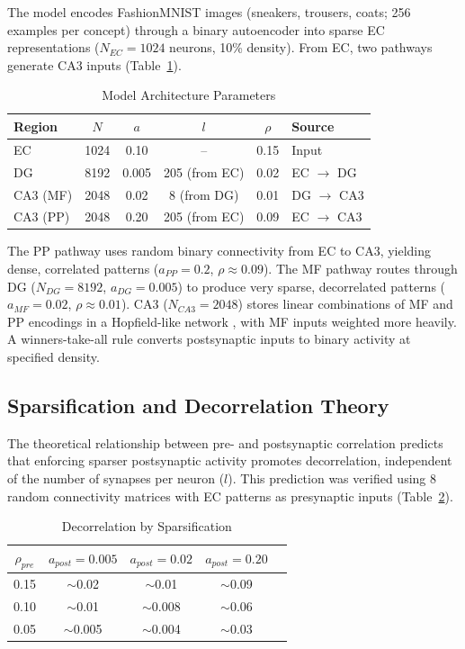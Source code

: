 \documentclass[11pt]{article}
\begin{document}
The model encodes FashionMNIST images (sneakers, trousers, coats; 256 examples per concept) through a binary autoencoder into sparse EC representations ($N_{EC} = 1024$ neurons, 10\% density). From EC, two pathways generate CA3 inputs (Table~\ref{tab:params}).

\begin{table}[ht]
\centering
\caption{Model Architecture Parameters}
\label{tab:params}
\begin{tabular}{lccccl}
\toprule
\textbf{Region} & \textbf{$N$} & \textbf{$a$} & \textbf{$l$} & \textbf{$\rho$} & \textbf{Source} \\
\midrule
EC & 1024 & 0.10 & -- & 0.15 & Input \\
DG & 8192 & 0.005 & 205 (from EC) & 0.02 & EC $\to$ DG \\
CA3 (MF) & 2048 & 0.02 & 8 (from DG) & 0.01 & DG $\to$ CA3 \\
CA3 (PP) & 2048 & 0.20 & 205 (from EC) & 0.09 & EC $\to$ CA3 \\
\bottomrule
\end{tabular}
\end{table}

The PP pathway uses random binary connectivity from EC to CA3, yielding dense, correlated patterns ($a_{PP} = 0.2$, $\rho \approx 0.09$). The MF pathway routes through DG ($N_{DG} = 8192$, $a_{DG} = 0.005$) to produce very sparse, decorrelated patterns ($a_{MF} = 0.02$, $\rho \approx 0.01$). CA3 ($N_{CA3} = 2048$) stores linear combinations of MF and PP encodings in a Hopfield-like network \citep{hopfield1982neural}, with MF inputs weighted more heavily. A winners-take-all rule converts postsynaptic inputs to binary activity at specified density.

\subsection{Sparsification and Decorrelation Theory}

The theoretical relationship between pre- and postsynaptic correlation predicts that enforcing sparser postsynaptic activity promotes decorrelation, independent of the number of synapses per neuron ($l$). This prediction was verified using 8 random connectivity matrices with EC patterns as presynaptic inputs (Table~\ref{tab:decorrelation}).

\begin{table}[ht]
\centering
\caption{Decorrelation by Sparsification}
\label{tab:decorrelation}
\begin{tabular}{ccccc}
\toprule
\textbf{$\rho_{pre}$} & \textbf{$a_{post} = 0.005$} & \textbf{$a_{post} = 0.02$} & \textbf{$a_{post} = 0.20$} \\
\midrule
0.15 & $\sim$0.02 & $\sim$0.01 & $\sim$0.09 \\
0.10 & $\sim$0.01 & $\sim$0.008 & $\sim$0.06 \\
0.05 & $\sim$0.005 & $\sim$0.004 & $\sim$0.03 \\
\bottomrule
\end{tabular}
\end{table}
\end{document}
